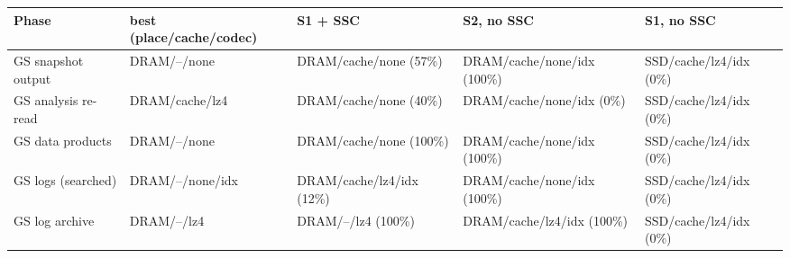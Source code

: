 \begin{tabular}{lllll}
\toprule
Phase & best (place/cache/codec) & S1 + SSC & S2, no SSC & S1, no SSC \\
\midrule
GS snapshot output & DRAM/--/none & DRAM/cache/none (57\%) & DRAM/cache/none/idx (100\%) & SSD/cache/lz4/idx (0\%) \\
GS analysis re-read & DRAM/cache/lz4 & DRAM/cache/none (40\%) & DRAM/cache/none/idx (0\%) & SSD/cache/lz4/idx (0\%) \\
GS data products & DRAM/--/none & DRAM/cache/none (100\%) & DRAM/cache/none/idx (100\%) & SSD/cache/lz4/idx (0\%) \\
GS logs (searched) & DRAM/--/none/idx & DRAM/cache/lz4/idx (12\%) & DRAM/cache/none/idx (100\%) & SSD/cache/lz4/idx (0\%) \\
GS log archive & DRAM/--/lz4 & DRAM/--/lz4 (100\%) & DRAM/cache/lz4/idx (100\%) & SSD/cache/lz4/idx (0\%) \\
\bottomrule
\end{tabular}
